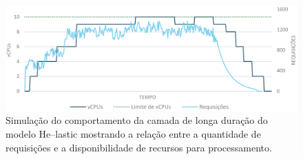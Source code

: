 \documentclass[english,brazilian]{UNISINOSmonografia} %
\newcommand\defaultFigureWidth{0.9}
\begin{document}
\begin{figure}[tb]
	\centering%
	\begin{minipage}{\defaultFigureWidth\textwidth}
		\caption{Simulação do comportamento da camada de longa duração do modelo \textsf{He}--lastic mostrando a relação entre a quantidade de requisições e a disponibilidade de recursos para processamento.}
		\label{fig:modelo-custben-container}
		\includegraphics[width=\textwidth]{modelo-custben-container}
	\end{minipage}
\end{figure}
\end{document}
